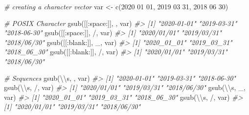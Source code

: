 \documentclass[
]{book}
\newenvironment{Shaded}{\begin{snugshade}}{\end{snugshade}}
\newcommand{\CommentTok}[1]{\textcolor[rgb]{0.56,0.35,0.01}{\textit{#1}}}
\newcommand{\FunctionTok}[1]{\textcolor[rgb]{0.00,0.00,0.00}{#1}}
\newcommand{\NormalTok}[1]{#1}
\newcommand{\OtherTok}[1]{\textcolor[rgb]{0.56,0.35,0.01}{#1}}
\newcommand{\SpecialCharTok}[1]{\textcolor[rgb]{0.00,0.00,0.00}{#1}}
\newcommand{\StringTok}[1]{\textcolor[rgb]{0.31,0.60,0.02}{#1}}
\begin{document}
\begin{Shaded}
\begin{Highlighting}[]
\CommentTok{\# creating a character vector}
\NormalTok{var }\OtherTok{\textless{}{-}} \FunctionTok{c}\NormalTok{(}\StringTok{\textquotesingle{}2020 01 01\textquotesingle{}}\NormalTok{, }\StringTok{\textquotesingle{}2019 03 31\textquotesingle{}}\NormalTok{, }\StringTok{\textquotesingle{}2018 06 30\textquotesingle{}}\NormalTok{)}

\CommentTok{\# POSIX Character}
\FunctionTok{gsub}\NormalTok{(}\StringTok{\textquotesingle{}[[:space:]]\textquotesingle{}}\NormalTok{, }\StringTok{\textquotesingle{}{-}\textquotesingle{}}\NormalTok{, var)}
\CommentTok{\#\textgreater{} [1] "2020{-}01{-}01" "2019{-}03{-}31" "2018{-}06{-}30"}
\FunctionTok{gsub}\NormalTok{(}\StringTok{\textquotesingle{}[[:space:]]\textquotesingle{}}\NormalTok{, }\StringTok{\textquotesingle{}/\textquotesingle{}}\NormalTok{, var)}
\CommentTok{\#\textgreater{} [1] "2020/01/01" "2019/03/31" "2018/06/30"}
\FunctionTok{gsub}\NormalTok{(}\StringTok{\textquotesingle{}[[:blank:]]\textquotesingle{}}\NormalTok{, }\StringTok{\textquotesingle{}\_\textquotesingle{}}\NormalTok{, var)}
\CommentTok{\#\textgreater{} [1] "2020\_01\_01" "2019\_03\_31" "2018\_06\_30"}
\FunctionTok{gsub}\NormalTok{(}\StringTok{\textquotesingle{}[[:blank:]]\textquotesingle{}}\NormalTok{, }\StringTok{\textquotesingle{}/\textquotesingle{}}\NormalTok{, var)}
\CommentTok{\#\textgreater{} [1] "2020/01/01" "2019/03/31" "2018/06/30"}

\CommentTok{\# Sequences}
\FunctionTok{gsub}\NormalTok{(}\StringTok{\textquotesingle{}}\SpecialCharTok{\textbackslash{}\textbackslash{}}\StringTok{s\textquotesingle{}}\NormalTok{, }\StringTok{\textquotesingle{}{-}\textquotesingle{}}\NormalTok{, var)}
\CommentTok{\#\textgreater{} [1] "2020{-}01{-}01" "2019{-}03{-}31" "2018{-}06{-}30"}
\FunctionTok{gsub}\NormalTok{(}\StringTok{\textquotesingle{}}\SpecialCharTok{\textbackslash{}\textbackslash{}}\StringTok{s\textquotesingle{}}\NormalTok{, }\StringTok{\textquotesingle{}/\textquotesingle{}}\NormalTok{, var)}
\CommentTok{\#\textgreater{} [1] "2020/01/01" "2019/03/31" "2018/06/30"}
\FunctionTok{gsub}\NormalTok{(}\StringTok{\textquotesingle{}}\SpecialCharTok{\textbackslash{}\textbackslash{}}\StringTok{s\textquotesingle{}}\NormalTok{, }\StringTok{\textquotesingle{}\_\textquotesingle{}}\NormalTok{, var)}
\CommentTok{\#\textgreater{} [1] "2020\_01\_01" "2019\_03\_31" "2018\_06\_30"}
\FunctionTok{gsub}\NormalTok{(}\StringTok{\textquotesingle{}}\SpecialCharTok{\textbackslash{}\textbackslash{}}\StringTok{s\textquotesingle{}}\NormalTok{, }\StringTok{\textquotesingle{}/\textquotesingle{}}\NormalTok{, var)}
\CommentTok{\#\textgreater{} [1] "2020/01/01" "2019/03/31" "2018/06/30"}


\end{Highlighting}
\end{Shaded}
\end{document}
